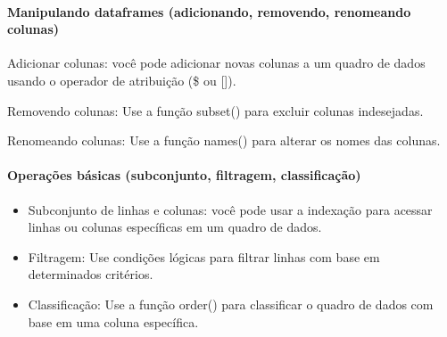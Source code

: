 \documentclass[
  letterpaper,
  DIV=11,
  numbers=noendperiod]{scrartcl}
\let\oldparagraph\paragraph
\renewcommand{\paragraph}[1]{\oldparagraph{#1}\mbox{}}
\newenvironment{Shaded}{\begin{snugshade}}{\end{snugshade}}
\newcommand{\AttributeTok}[1]{\textcolor[rgb]{0.40,0.45,0.13}{#1}}
\newcommand{\CommentTok}[1]{\textcolor[rgb]{0.37,0.37,0.37}{#1}}
\newcommand{\FunctionTok}[1]{\textcolor[rgb]{0.28,0.35,0.67}{#1}}
\newcommand{\NormalTok}[1]{\textcolor[rgb]{0.00,0.23,0.31}{#1}}
\newcommand{\OtherTok}[1]{\textcolor[rgb]{0.00,0.23,0.31}{#1}}
\newcommand{\SpecialCharTok}[1]{\textcolor[rgb]{0.37,0.37,0.37}{#1}}
\newcommand{\StringTok}[1]{\textcolor[rgb]{0.13,0.47,0.30}{#1}}
\begin{document}
\hypertarget{manipulando-dataframes-adicionando-removendo-renomeando-colunas}{%
\paragraph{Manipulando dataframes (adicionando, removendo, renomeando
colunas)}\label{manipulando-dataframes-adicionando-removendo-renomeando-colunas}}

Adicionar colunas: você pode adicionar novas colunas a um quadro de
dados usando o operador de atribuição (\$ ou {[}{]}).

Removendo colunas: Use a função subset() para excluir colunas
indesejadas.

Renomeando colunas: Use a função names() para alterar os nomes das
colunas.

\begin{Shaded}
\end{Shaded}

\hypertarget{operauxe7uxf5es-buxe1sicas-subconjunto-filtragem-classificauxe7uxe3o}{%
\paragraph{Operações básicas (subconjunto, filtragem,
classificação)}\label{operauxe7uxf5es-buxe1sicas-subconjunto-filtragem-classificauxe7uxe3o}}

\begin{itemize}
\item
  Subconjunto de linhas e colunas: você pode usar a indexação para
  acessar linhas ou colunas específicas em um quadro de dados.
\item
  Filtragem: Use condições lógicas para filtrar linhas com base em
  determinados critérios.
\item
  Classificação: Use a função order() para classificar o quadro de dados
  com base em uma coluna específica.
\end{itemize}
\end{document}
